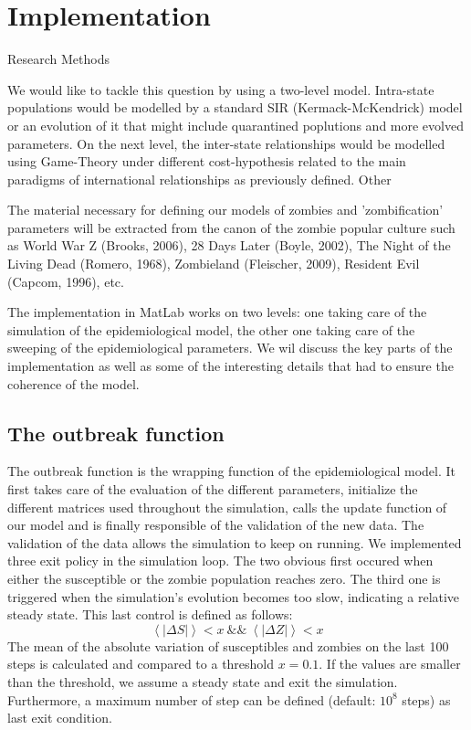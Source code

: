 \documentclass[11pt]{article}
\begin{document}
\section{Implementation}\indent
Research Methods

We would like to tackle this question by using a two-level model. Intra-state populations would be modelled by a standard SIR (Kermack-McKendrick) model or an evolution of it that might include quarantined poplutions and more evolved parameters. On the next level, the inter-state relationships would be modelled using Game-Theory under different cost-hypothesis related to the main paradigms of international relationships as previously defined.
Other

The material necessary for defining our models of zombies and 'zombification' parameters will be extracted from the canon of the zombie popular culture such as World War Z (Brooks, 2006), 28 Days Later (Boyle, 2002), The Night of the Living Dead (Romero, 1968), Zombieland (Fleischer, 2009), Resident Evil (Capcom, 1996), etc.

The implementation in MatLab works on two levels: one taking care of the simulation of the epidemiological model, the other one taking care of the sweeping of the epidemiological parameters. We wil discuss the key parts of the implementation as well as some of the interesting details that had to ensure the coherence of the model.

\subsection{The outbreak function}
The outbreak function is the wrapping function of the epidemiological model. It first takes care of the evaluation of the different parameters, initialize the different matrices used throughout the simulation, calls the update function of our model and is finally responsible of the validation of the new data. The validation of the data allows the simulation to keep on running. We implemented three exit policy in the simulation loop. The two obvious first occured when either the susceptible or the zombie population reaches zero. The third one is triggered when the simulation's evolution becomes too slow, indicating a relative steady state. This last control is defined as follows:
\begin{equation}
\left\langle \left| \Delta S \right| \right\rangle < x\ \&\&\ \left\langle\left|\Delta Z \right| \right\rangle < x
\end{equation}
The mean of the absolute variation of susceptibles and zombies on the last 100 steps is calculated and compared to a threshold $x = 0.1$. If the values are smaller than the threshold, we assume a steady state and exit the simulation. Furthermore, a maximum number of step can be defined (default: $10^8$ steps) as last exit condition.
\end{document}
